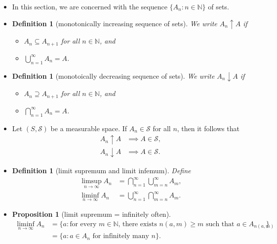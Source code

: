 \documentclass[10pt]{article}
\newtheorem{definition}[lemma]{Definition}
\newtheorem{proposition}[lemma]{Proposition}
\numberwithin{lemma}{section}
\newcommand{\mcal}[1]{\mathcal{#1}}
\newcommand{\Nat}{\mathbb{N}}
\begin{document}
\begin{itemize}
  \item In this section, we are concerned with the sequence $\{A_n : n \in \Nat \}$ of sets.
  
  \item \begin{definition}[monotonically increasing sequence of sets]
    We write $A_n \uparrow A$ if
    \begin{itemize}
      \item $A_n \subseteq A_{n+1}$ for all $n \in \Nat$, and
      \item $\bigcup_{n=1}^\infty A_n = A$.
    \end{itemize}
  \end{definition}

  \item \begin{definition}[monotoically decreasing sequence of sets]
    We write $A_n \downarrow A$ if
    \begin{itemize}
      \item $A_n \supseteq A_{n+1}$ for all $n \in \Nat$, and
      \item $\bigcap_{n=1}^\infty A_n = A$.
    \end{itemize} 
  \end{definition}

  \item Let $(S, \mcal{S})$ be a measurable space. If $A_n \in \mcal{S}$ for all $n$, then it follows that
  \begin{align*}
    A_n \uparrow A &\implies A \in \mcal{S}, \\
    A_n \downarrow A &\implies A \in \mcal{S}.
  \end{align*}

  \item \begin{definition}[limit supremum and limit infemum] Define
    \begin{align*}
      \limsup_{n \rightarrow \infty} A_n &= \bigcap_{n=1}^\infty \bigcup_{m=n}^\infty A_m, \\
      \liminf_{n \rightarrow \infty} A_n &= \bigcup_{n=1}^\infty \bigcap_{m=n}^\infty A_m.
    \end{align*}
  \end{definition}

  \item \begin{proposition}[limit supremum = infinitely often]
    \begin{align*}
      \liminf_{n \rightarrow \infty} A_n
      &= \{ a : \mbox{for every $m \in \Nat$, there exists $n(a,m) \geq m$ such that $a \in A_{n(a,m)}$} \} \\
      &= \{ a : a \in A_n \mbox{ for infinitely many $n$} \}.
    \end{align*}
  \end{proposition}


\end{itemize}
\end{document}
